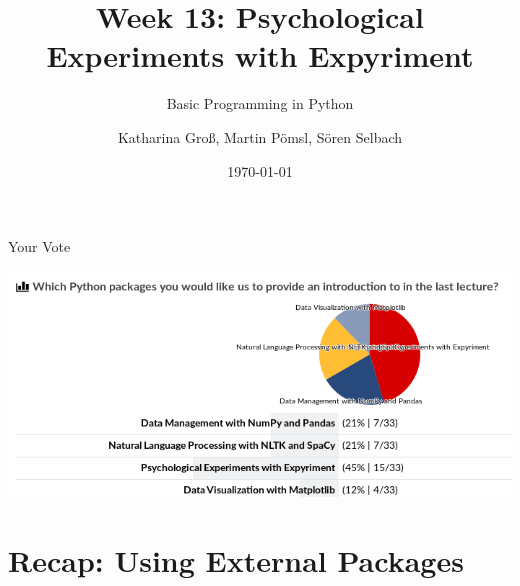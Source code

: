 



\title[Expyriment]{Week 13: Psychological Experiments with Expyriment}
\subtitle{Basic Programming in Python}

\author[kgross, mpoemsl, sselbach]{Katharina Groß, Martin Pömsl, Sören Selbach}

\date{\today}

\begin{frame}[plain]
    \titlepage
\end{frame}


\begin{frame}{Your Vote}
    
    \includegraphics[width=\textwidth]{13_Expyriment/poll.png}
    
\end{frame}

\begin{frame}
    \tableofcontents
\end{frame}


\section{Recap: Using External Packages}


